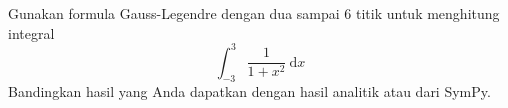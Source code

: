 \begin{soal}
Gunakan formula Gauss-Legendre dengan dua sampai 6 titik untuk menghitung integral
\begin{equation}
\int_{-3}^{3} \frac{1}{1 + x^2}\ \mathrm{d}x
\end{equation}
Bandingkan hasil yang Anda dapatkan dengan hasil analitik atau dari SymPy.
\end{soal}
